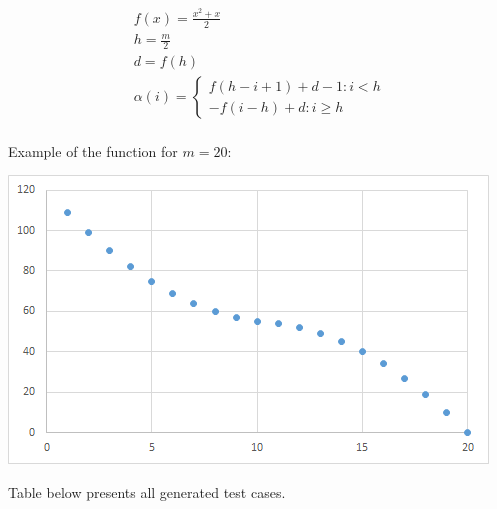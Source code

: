 \begin{gather}
	f(x) = \frac{x^{2}+x}{2} \\
	h = \frac{m}{2} \\
	d = f(h) \\
	\alpha(i) = \begin{cases} f(h-i+1)+d-1 : i<h \\ -f(i-h)+d : i \geq h \end{cases}
\end{gather}
\\

Example of the function for $m = 20$:

\begin{center}
	\includegraphics[scale=0.75]{satfun2}
\end{center}

\newpage

Table below presents all generated test cases.

